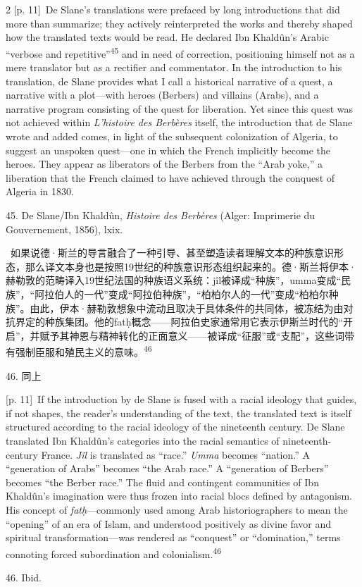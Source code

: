 \documentclass[10pt,a4paper]{article}
\begin{document}
\begin{paracol}{2}
{\scriptsize\color{gray} [p. 11]}\ De Slane’s translations were prefaced by long introductions that did more than summarize; they actively reinterpreted the works and thereby shaped how the translated texts would be read. He declared Ibn Khaldûn’s Arabic “verbose and repetitive”\nobreak\textsuperscript{45} and in need of correction, positioning himself not as a mere translator but as a rectifier and commentator. In the introduction to his translation, de Slane provides what I call a historical narrative of a quest, a narrative with a plot—with heroes (Berbers) and villains (Arabs), and a narrative program consisting of the quest for liberation. Yet since this quest was not achieved within \textit{L’histoire des Berbères} itself, the introduction that de Slane wrote and added comes, in light of the subsequent colonization of Algeria, to suggest an unspoken quest—one in which the French implicitly become the heroes. They appear as liberators of the Berbers from the “Arab yoke,” a liberation that the French claimed to have achieved through the conquest of Algeria in 1830.\par{\small 45. De Slane/Ibn Khaldûn, \textit{Histoire des Berbères} (Alger: Imprimerie du Gouvernement, 1856), lxix.\par}
\switchcolumn*
{\scriptsize\color{gray} [p. 11]}\ 如果说德·斯兰的导言融合了一种引导、甚至塑造读者理解文本的种族意识形态，那么译文本身也是按照19世纪的种族意识形态组织起来的。德·斯兰将伊本·赫勒敦的范畴译入19世纪法国的种族语义系统：jîl被译成“种族”，umma变成“民族”，“阿拉伯人的一代”变成“阿拉伯种族”，“柏柏尔人的一代”变成“柏柏尔种族”。由此，伊本·赫勒敦想象中流动且取决于具体条件的共同体，被冻结为由对抗界定的种族集团。他的fatḥ概念——阿拉伯史家通常用它表示伊斯兰时代的“开启”，并赋予其神恩与精神转化的正面意义——被译成“征服”或“支配”，这些词带有强制臣服和殖民主义的意\mbox{味。\textsuperscript{46}}\par{\small 46. 同上\par}
\switchcolumn
{\scriptsize\color{gray} [p. 11]}\ If the introduction by de Slane is fused with a racial ideology that guides, if not shapes, the reader’s understanding of the text, the translated text is itself structured according to the racial ideology of the nineteenth century. De Slane translated Ibn Khaldûn’s categories into the racial semantics of nineteenth-century France. \textit{Jîl} is translated as “race.” \textit{Umma} becomes “nation.” A “generation of Arabs” becomes “the Arab race.” A “generation of Berbers” becomes “the Berber race.” The fluid and contingent communities of Ibn Khaldûn’s imagination were thus frozen into racial blocs defined by antagonism. His concept of \textit{fatḥ}—commonly used among Arab historiographers to mean the “opening” of an era of Islam, and understood positively as divine favor and spiritual transformation—was rendered as “conquest” or “domination,” terms connoting forced subordination and colonialism.\nobreak\textsuperscript{46}\par{\small 46. Ibid.\par}

\end{paracol}
\end{document}
